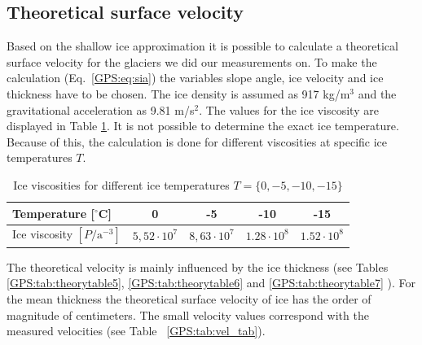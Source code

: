 \subsection{Theoretical surface velocity}
Based on the shallow ice approximation it is possible to calculate a theoretical surface velocity for the glaciers we did our measurements on.
To make the calculation (Eq.~\ref{GPS:eq:sia}) the variables slope angle, ice velocity and ice thickness have to be chosen. 
The ice density is assumed as 917 kg/m$^3$ and the gravitational acceleration as 9.81  m/s$^2$.
The values for the ice viscosity are displayed in Table \ref{GPS:tab:iceviscosities}.
It is not possible to determine the exact ice temperature.
Because of this, the calculation is done for different viscosities at specific ice temperatures $T$.

\begin{table}[htb]
\centering
\begin{tabular}{lcccc}
\toprule
Temperature [$^\circ$C] & 0 & -5 & -10 & -15 \\
\midrule
Ice viscosity $\left[ P / \text{a}^{-3} \right]$ & $5,52 \cdot 10^7$ & $8,63 \cdot 10^7$ & $1.28 \cdot 10^8$ & $1.52 \cdot 10^8$\\
\bottomrule
\end{tabular}
\caption{Ice viscosities for different ice temperatures $T = \{0,-5,-10,-15\}$}
\label{GPS:tab:iceviscosities}
\end{table}

The theoretical velocity is mainly influenced by the ice thickness (see Tables \ref{GPS:tab:theorytable5}, \ref{GPS:tab:theorytable6} and \ref{GPS:tab:theorytable7} ).
For the mean thickness the theoretical surface velocity of ice has the order of magnitude of centimeters. 
The small velocity values correspond with the measured velocities (see Table~ \ref{GPS:tab:vel_tab}). 

